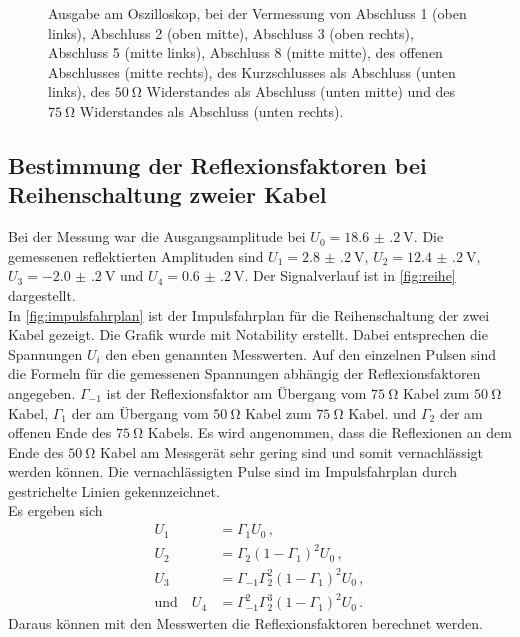 \begin{figure}[ht]
    \caption{Ausgabe am Oszilloskop, bei der Vermessung von Abschluss 1 (oben links), Abschluss 2 (oben mitte), Abschluss 3 (oben rechts), Abschluss 5 (mitte links), Abschluss 8 (mitte mitte), des offenen Abschlusses (mitte rechts), des Kurzschlusses als Abschluss (unten links), des $\qty{50}{\ohm}$ Widerstandes als Abschluss (unten mitte) und des $\qty{75}{\ohm}$ Widerstandes als Abschluss (unten rechts).}
    \label{fig:abschlussbilder}
\end{figure}
\FloatBarrier
%
%
%
%
%
%
\subsection{Bestimmung der Reflexionsfaktoren bei Reihenschaltung zweier Kabel}\label{subsec:refl}
Bei der Messung war die Ausgangsamplitude bei $U_0=\qty{18.6(2)}{\volt}$.
Die gemessenen reflektierten Amplituden sind $U_1=\qty{2.8(2)}{\volt}$, $U_2=\qty{12.4(2)}{\volt}$, $U_3=\qty{-2.0(2)}{\volt}$ und $U_4=\qty{0.6(2)}{\volt}$.
Der Signalverlauf ist in \autoref{fig:reihe} dargestellt.
\\
In \autoref{fig:impulsfahrplan} ist der Impulsfahrplan für die Reihenschaltung der zwei Kabel gezeigt. 
Die Grafik wurde mit Notability \cite{notability} erstellt.
Dabei entsprechen die Spannungen $U_i$ den eben genannten Messwerten. 
Auf den einzelnen Pulsen sind die Formeln für die gemessenen Spannungen abhängig der Reflexionsfaktoren angegeben.
$\Gamma_{-1}$ ist der Reflexionsfaktor am Übergang vom $\qty{75}{\ohm}$ Kabel zum $\qty{50}{\ohm}$ Kabel, $\Gamma_1$ der am Übergang vom $\qty{50}{\ohm}$ Kabel zum $\qty{75}{\ohm}$ Kabel.
und $\Gamma_2$ der am offenen Ende des $\qty{75}{\ohm}$ Kabels.
Es wird angenommen, dass die Reflexionen an dem Ende des $\qty{50}{\ohm}$ Kabel am Messgerät sehr gering sind und somit vernachlässigt werden können. 
Die vernachlässigten Pulse sind im Impulsfahrplan durch gestrichelte Linien gekennzeichnet. 
\\
Es ergeben sich 
\begin{align}
    U_1 &= \Gamma_1 U_0 \label{eqn:u1}\, ,\\
    U_2 &= \Gamma_2 \left(1-\Gamma_1\right)^2 U_0 \label{eqn:u2}\,, \\
    U_3 &= \Gamma_{-1} \Gamma_2^2 \left(1-\Gamma_1\right)^2 U_0 \label{eqn:u3}\,, \\
    \mathrm{und} \quad U_4 &= \Gamma_{-1}^2 \Gamma_2^3 \left(1-\Gamma_1\right)^2 U_0 \label{eqn:u4} \, .
\end{align}
Daraus können mit den Messwerten die Reflexionsfaktoren berechnet werden.
